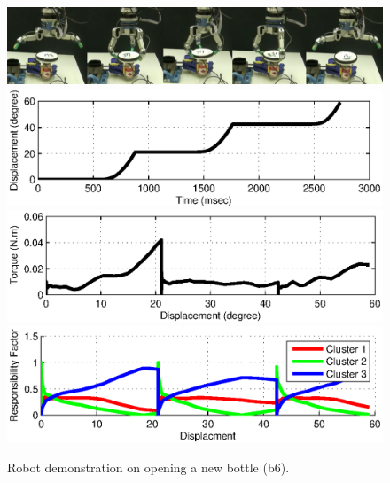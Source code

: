 \begin{figure}
  \centering
  \includegraphics[width=15cm]{./fig/demo_b6.jpg}
  \includegraphics[width=15cm]{./fig/demo_b6_s.eps}
  \includegraphics[width=15cm]{./fig/demo_b6_T.eps}
  \includegraphics[width=15cm]{./fig/demo_b6_rf.eps}
  \caption{ \scriptsize{Robot demonstration on opening a new bottle (b6).}
}
\label{fig:demo_b6}
\end{figure}





